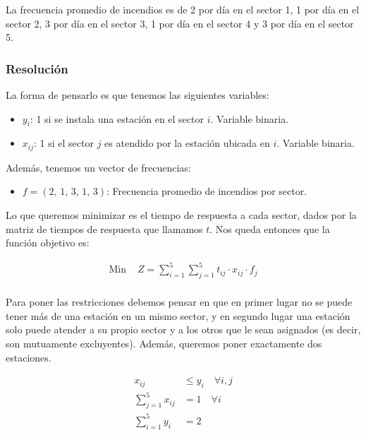 \documentclass[12pt]{article}
\begin{document}
La frecuencia promedio de incendios es de 2 por día en el sector 1, 1 por día en el sector 2, 3 por día en el sector 3, 1 por día en el sector 4 y 3 por día en el sector 5.

\subsubsection{Resolución}

La forma de pensarlo es que tenemos las siguientes variables:

\begin{itemize}[label=$\rightarrow$]
    \item $y_i$: 1 si se instala una estación en el sector $i$. Variable binaria.
    \item $x_{ij}$: 1 si el sector $j$ es atendido por la estación ubicada en $i$. Variable binaria.
\end{itemize}

Además, tenemos un vector de frecuencias:

\begin{itemize}[label=$\rightarrow$]
    \item $f = (2,\,1,\,3,\,1,\,3)$: Frecuencia promedio de incendios por sector.
\end{itemize}

Lo que queremos minimizar es el tiempo de respuesta a cada sector, dados por la matriz de tiempos de respuesta que llamamos $t$. Nos queda entonces que la función objetivo es:

\begin{align*}
    \text{Min } & Z = \sum_{i=1}^{5} \sum_{j=1}^{5} t_{ij} \cdot x_{ij} \cdot f_j \\
\end{align*}

Para poner las restricciones debemos pensar en que en primer lugar no se puede tener más de una estación en un mismo sector, y en segundo lugar una estación solo puede atender a su propio sector y a los otros que le sean asignados (es decir, son mutuamente excluyentes). Además, queremos poner exactamente dos estaciones.

\begin{align*}
    x_{ij} &\le y_i \quad \forall i,j \\
    \sum_{j=1}^{5} x_{ij} &= 1 \quad \forall i \\
    \sum_{i=1}^{5} y_i &= 2 \\
\end{align*}
\end{document}
